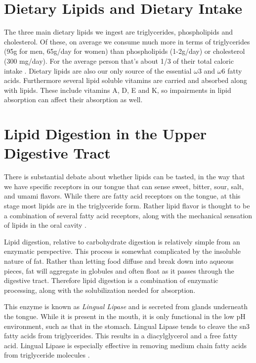 \documentclass{tufte-handout}
\begin{document}
\section{Dietary Lipids and Dietary Intake}

The three main dietary lipids we ingest are triglycerides, phospholipids and cholesterol.  Of these, on average we consume much more in terms of triglycerides (95g for men, 65g/day for women) than phospholipids (1-2g/day) or cholesterol (300 mg/day).  For the average person that's about 1/3 of their total caloric intake \citep{NationalCenterforHealthStatistics2017}.  Dietary lipids are also our only source of the essential $\omega$3 and $\omega$6 fatty acids.  Furthermore several lipid soluble vitamins are carried and absorbed along with lipids.  These include vitamins A, D, E and K, so impairments in lipid absorption can affect their absorption as well.

\section{Lipid Digestion in the Upper Digestive Tract}

There is substantial debate about whether lipids can be tasted, in the way that we have specific receptors in our tongue that can sense sweet, bitter, sour, salt, and umami flavors.  While there are fatty acid receptors on the tongue, at this stage most lipids are in the triglyceride form.  Rather lipid flavor is thought to be a combination of several fatty acid receptors, along with the mechanical sensation of lipids in the oral cavity \citep{DiPatrizio2014}.

Lipid digestion, relative to carbohydrate digestion is relatively simple from an enzymatic perspective.  This process is somewhat complicated by the insoluble nature of fat.  Rather than letting food diffuse and break down into aqueous pieces, fat will aggregate in globules and often float as it passes through the digestive tract.  Therefore lipid digestion is a combination of enzymatic processing, along with the solubilization needed for absorption.

  This enzyme is known as \emph{Lingual Lipase} and is secreted from glands underneath the tongue.  While it is present in the mouth, it is only functional in the low pH environment, such as that in the stomach.  Lingual Lipase tends to cleave the sn3 fatty acids from triglycerides.  This results in a diacylglycerol and a free fatty acid. Lingual Lipase is especially effective in removing medium chain fatty acids from triglyceride molecules \citep{Jensen1983}.
\end{document}
